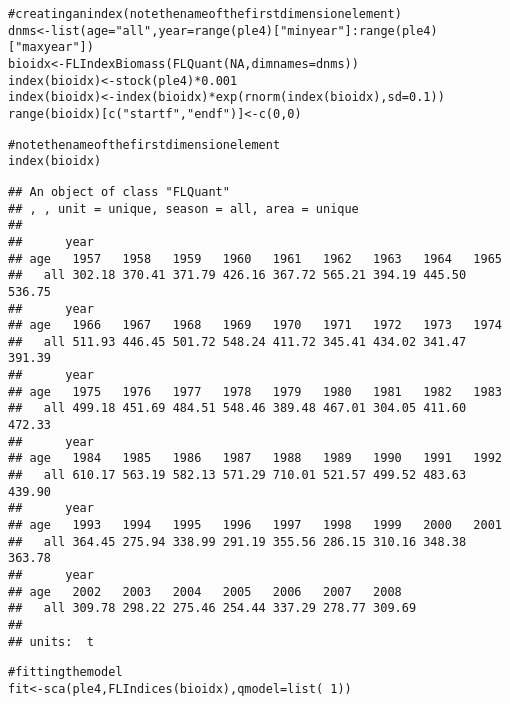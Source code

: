 \documentclass[a4paper,english,10pt]{article}\usepackage[]{graphicx}\usepackage[]{color}
\makeatletter
\newcommand{\hlnum}[1]{\textcolor[rgb]{0.2,0.2,0.2}{#1}}%
\newcommand{\hlstr}[1]{\textcolor[rgb]{0.2,0.2,0.2}{#1}}%
\newcommand{\hlcom}[1]{\textcolor[rgb]{0.2,0.267,0.4}{#1}}%
\newcommand{\hlopt}[1]{\textcolor[rgb]{0.2,0.2,0.2}{#1}}%
\newcommand{\hlstd}[1]{\textcolor[rgb]{0,0,0}{#1}}%
\newcommand{\hlkwb}[1]{\textcolor[rgb]{0.361,0.506,0.596}{#1}}%
\newcommand{\hlkwc}[1]{\textcolor[rgb]{0.361,0.506,0.596}{#1}}%
\newcommand{\hlkwd}[1]{\textcolor[rgb]{0.361,0.506,0.596}{#1}}%
\newenvironment{kframe}{%
 \def\at@end@of@kframe{}%
 \ifinner\ifhmode%
  \def\at@end@of@kframe{\end{minipage}}%
  \begin{minipage}{\columnwidth}%
 \fi\fi%
 \def\FrameCommand##1{\hskip\@totalleftmargin \hskip-\fboxsep
 \colorbox{shadecolor}{##1}\hskip-\fboxsep
     \hskip-\linewidth \hskip-\@totalleftmargin \hskip\columnwidth}%
 \MakeFramed {\advance\hsize-\width
   \@totalleftmargin\z@ \linewidth\hsize
   \@setminipage}}%
 {\par\unskip\endMakeFramed%
 \at@end@of@kframe}
\newenvironment{knitrout}{}{} %
\makeatother
\begin{document}
\begin{knitrout}
\color{fgcolor}\begin{kframe}
\begin{alltt}
\hlcom{# creating an index (note the name of the first dimension element)}
\hlstd{dnms} \hlkwb{<-} \hlkwd{list}\hlstd{(}\hlkwc{age}\hlstd{=}\hlstr{"all"}\hlstd{,} \hlkwc{year}\hlstd{=}\hlkwd{range}\hlstd{(ple4)[}\hlstr{"minyear"}\hlstd{]}\hlopt{:}\hlkwd{range}\hlstd{(ple4)[}\hlstr{"maxyear"}\hlstd{])}
\hlstd{bioidx} \hlkwb{<-} \hlkwd{FLIndexBiomass}\hlstd{(}\hlkwd{FLQuant}\hlstd{(}\hlnum{NA}\hlstd{,} \hlkwc{dimnames}\hlstd{=dnms))}
\hlkwd{index}\hlstd{(bioidx)} \hlkwb{<-} \hlkwd{stock}\hlstd{(ple4)}\hlopt{*}\hlnum{0.001}
\hlkwd{index}\hlstd{(bioidx)} \hlkwb{<-} \hlkwd{index}\hlstd{(bioidx)}\hlopt{*}\hlkwd{exp}\hlstd{(}\hlkwd{rnorm}\hlstd{(}\hlkwd{index}\hlstd{(bioidx),} \hlkwc{sd}\hlstd{=}\hlnum{0.1}\hlstd{))}
\hlkwd{range}\hlstd{(bioidx)[}\hlkwd{c}\hlstd{(}\hlstr{"startf"}\hlstd{,}\hlstr{"endf"}\hlstd{)]} \hlkwb{<-} \hlkwd{c}\hlstd{(}\hlnum{0}\hlstd{,}\hlnum{0}\hlstd{)}

\hlcom{# note the name of the first dimension element}
\hlkwd{index}\hlstd{(bioidx)}
\end{alltt}
\begin{verbatim}
## An object of class "FLQuant"
## , , unit = unique, season = all, area = unique
## 
##      year
## age   1957   1958   1959   1960   1961   1962   1963   1964   1965  
##   all 302.18 370.41 371.79 426.16 367.72 565.21 394.19 445.50 536.75
##      year
## age   1966   1967   1968   1969   1970   1971   1972   1973   1974  
##   all 511.93 446.45 501.72 548.24 411.72 345.41 434.02 341.47 391.39
##      year
## age   1975   1976   1977   1978   1979   1980   1981   1982   1983  
##   all 499.18 451.69 484.51 548.46 389.48 467.01 304.05 411.60 472.33
##      year
## age   1984   1985   1986   1987   1988   1989   1990   1991   1992  
##   all 610.17 563.19 582.13 571.29 710.01 521.57 499.52 483.63 439.90
##      year
## age   1993   1994   1995   1996   1997   1998   1999   2000   2001  
##   all 364.45 275.94 338.99 291.19 355.56 286.15 310.16 348.38 363.78
##      year
## age   2002   2003   2004   2005   2006   2007   2008  
##   all 309.78 298.22 275.46 254.44 337.29 278.77 309.69
## 
## units:  t
\end{verbatim}
\begin{alltt}
\hlcom{# fitting the model}
\hlstd{fit} \hlkwb{<-} \hlkwd{sca}\hlstd{(ple4,} \hlkwd{FLIndices}\hlstd{(bioidx),} \hlkwc{qmodel}\hlstd{=}\hlkwd{list}\hlstd{(}\hlopt{~}\hlnum{1}\hlstd{))}
\end{alltt}
\end{kframe}
\end{knitrout}
\end{document}
